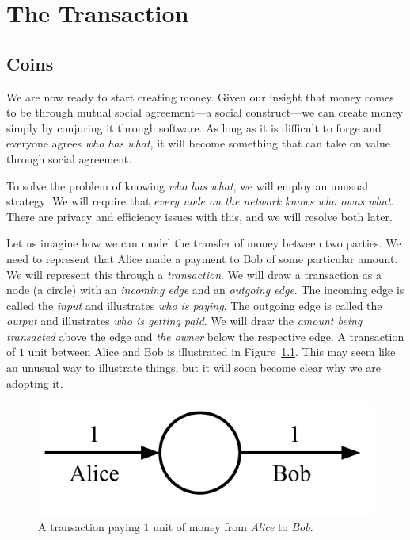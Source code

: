 \chapter{The Transaction}\label{chapter:transaction}


\section{Coins}
We are now ready to start creating money. Given our insight that money comes to be
through mutual social agreement---a social construct---we can create money simply by conjuring
it through software. As long as it is difficult to forge and everyone agrees
\emph{who has what}, it will become something that can take on value through social
agreement.

To solve the problem of knowing \emph{who has what}, we will employ an unusual strategy:
We will require that \emph{every node on the network knows who owns what}. There are privacy
and efficiency issues with this, and we will resolve both later.

Let us imagine how we can model the transfer of money between two parties. We need to represent
that Alice made a payment to Bob of some particular amount. We will represent this through a
\emph{transaction}. We will draw a transaction as a node (a circle) with an \emph{incoming edge}
and an \emph{outgoing edge}. The incoming edge is called the \emph{input} and
illustrates \emph{who is paying}. The outgoing
edge is called the \emph{output} and illustrates
\emph{who is getting paid}. We will draw the \emph{amount being transacted}
above the edge and \emph{the owner} below the respective edge. A transaction of $1$ unit
between Alice and Bob is illustrated in Figure~\ref{fig.utxo-transaction}. This may seem like
an unusual way to illustrate things, but it will soon become clear why we are adopting it.

\begin{figure}[h]
    \centering
    \includegraphics[width=0.35 \columnwidth,keepaspectratio]{figures/utxo-transaction.pdf}
    \caption{A transaction paying $1$ unit of money from \emph{Alice} to \emph{Bob}.}
    \label{fig.utxo-transaction}
\end{figure}


